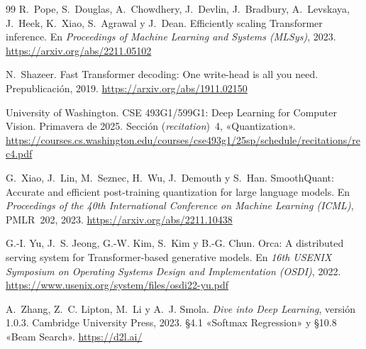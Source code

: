 \begin{thebibliography}{99}
R.~Pope, S.~Douglas, A.~Chowdhery, J.~Devlin, J.~Bradbury, A.~Levskaya, J.~Heek, K.~Xiao, S.~Agrawal y J.~Dean.
\newblock Efficiently scaling Transformer inference.
\newblock En \emph{Proceedings of Machine Learning and Systems (MLSys)}, 2023.
\newblock \url{https://arxiv.org/abs/2211.05102}

N.~Shazeer.
\newblock Fast Transformer decoding: One write-head is all you need.
\newblock Prepublicación, 2019.
\newblock \url{https://arxiv.org/abs/1911.02150}

University of Washington.
\newblock CSE 493G1/599G1: Deep Learning for Computer Vision.
\newblock Primavera de 2025. Sección (\emph{recitation})~4, «Quantization».
\newblock \url{https://courses.cs.washington.edu/courses/cse493g1/25sp/schedule/recitations/rec4.pdf}

G.~Xiao, J.~Lin, M.~Seznec, H.~Wu, J.~Demouth y S.~Han.
\newblock SmoothQuant: Accurate and efficient post-training quantization for large language models.
\newblock En \emph{Proceedings of the 40th International Conference on Machine Learning (ICML)}, PMLR~202, 2023.
\newblock \url{https://arxiv.org/abs/2211.10438}

G.-I. Yu, J.~S. Jeong, G.-W. Kim, S.~Kim y B.-G. Chun.
\newblock Orca: A distributed serving system for Transformer-based generative models.
\newblock En \emph{16th USENIX Symposium on Operating Systems Design and Implementation (OSDI)}, 2022.
\newblock \url{https://www.usenix.org/system/files/osdi22-yu.pdf}

A.~Zhang, Z.~C. Lipton, M.~Li y A.~J. Smola.
\newblock \emph{Dive into Deep Learning}, versión 1.0.3.
\newblock Cambridge University Press, 2023. §4.1 «Softmax Regression» y §10.8 «Beam Search».
\newblock \url{https://d2l.ai/}

\end{thebibliography}

